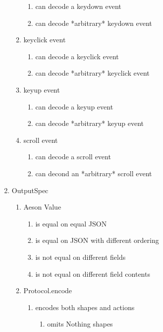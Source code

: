 \begin{enumerate}[label={T\arabic*}]
\begin{enumerate}[label={T\arabic{enumi}.\arabic*}]
\begin{enumerate}[label={T\arabic{enumi}.\arabic{enumii}.\arabic*}]
			\item can decode a keydown event
			\item can decode *arbitrary* keydown event
		\end{enumerate}
		\item keyclick event
		\begin{enumerate}[label={T\arabic{enumi}.\arabic{enumii}.\arabic*}]
			\item can decode a keyclick event
			\item can decode *arbitrary* keyclick event
			\end{enumerate}
		\item keyup event
		\begin{enumerate}[label={T\arabic{enumi}.\arabic{enumii}.\arabic*}]
			\item can decode a keyup event
			\item can decode *arbitrary* keyup event
		\end{enumerate}
		\item scroll event
		\begin{enumerate}[label={T\arabic{enumi}.\arabic{enumii}.\arabic*}]
			\item can decode a scroll event
			\item can decond an *arbitrary* scroll event
		\end{enumerate}
	\end{enumerate}
	\item OutputSpec
	\begin{enumerate}[label={T\arabic{enumi}.\arabic*}]
	    \item Aeson Value
	    \begin{enumerate}[label={T\arabic{enumi}.\arabic{enumii}.\arabic*}]
	        \item is equal on equal JSON
	        \item is equal on JSON with different ordering
	        \item is not equal on different fields
	        \item is not equal on different field contents
	    \end{enumerate}
	    \item Protocol.encode
	    \begin{enumerate}[label={T\arabic{enumi}.\arabic{enumii}.\arabic*}]
	        \item encodes both shapes and actions
	        \begin{enumerate}[label={T\arabic{enumi}.\arabic{enumii}.\arabic{enumiii}.\arabic*}]
            	\item omits Nothing shapes

\end{enumerate}
\end{enumerate}
\end{enumerate}
\end{enumerate}
